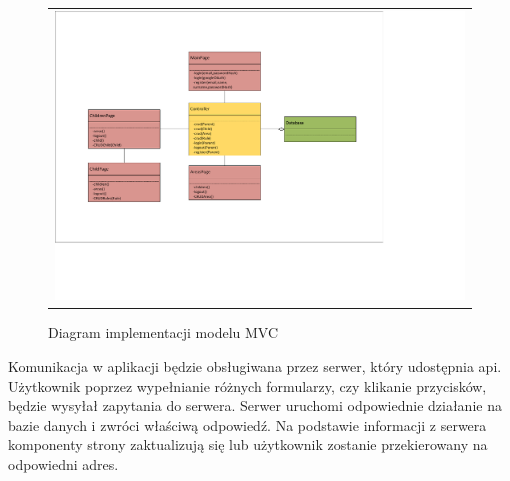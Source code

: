 \documentclass{sprawozdanie-agh}
\begin{document}
		\begin{figure}[H] 
			\centering
			\begin{tabular}{c}
				\includegraphics[width=1.3\textwidth]{MVC} 
			\end{tabular} 
			\caption{Diagram implementacji modelu MVC}
		\end{figure}

		Komunikacja w aplikacji będzie obsługiwana przez serwer, który udostępnia api. Użytkownik poprzez wypełnianie różnych formularzy, czy klikanie przycisków, będzie wysyłał zapytania do serwera. Serwer uruchomi odpowiednie działanie na bazie danych i zwróci właściwą odpowiedź. Na podstawie informacji z serwera komponenty strony zaktualizują się lub użytkownik zostanie przekierowany na odpowiedni adres.
		
\end{document}
